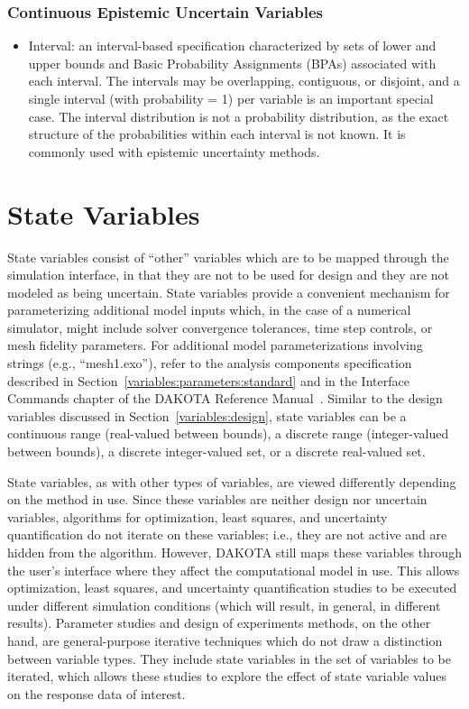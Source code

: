 \subsubsection{Continuous Epistemic Uncertain Variables}\label{variables:uncertain:ceuv}

\begin{itemize}

\item Interval: an interval-based specification characterized by sets of
  lower and upper bounds and Basic Probability Assignments (BPAs)
  associated with each interval.  The intervals may be overlapping,
  contiguous, or disjoint, and a single interval (with probability =
  1) per variable is an important special case.  The interval
  distribution is not a probability distribution, as the exact
  structure of the probabilities within each interval is not known.
  It is commonly used with epistemic uncertainty methods.

\end{itemize}

\section{State Variables}\label{variables:state}

State variables consist of ``other'' variables which are to be mapped
through the simulation interface, in that they are not to be used for
design and they are not modeled as being uncertain. State variables
provide a convenient mechanism for parameterizing additional model
inputs which, in the case of a numerical simulator, might include
solver convergence tolerances, time step controls, or mesh fidelity
parameters. For additional model parameterizations involving strings
(e.g., ``mesh1.exo''), refer to the analysis components specification
described in Section~\ref{variables:parameters:standard} and in the
Interface Commands chapter of the DAKOTA Reference
Manual~\cite{RefMan}.  Similar to the design variables discussed in
Section~\ref{variables:design}, state variables can be a continuous
range (real-valued between bounds), a discrete range (integer-valued
between bounds), a discrete integer-valued set, or a discrete
real-valued set.

State variables, as with other types of variables, are viewed
differently depending on the method in use. Since these variables are
neither design nor uncertain variables, algorithms for optimization,
least squares, and uncertainty quantification do not iterate on these
variables; i.e., they are not active and are hidden from the
algorithm. However, DAKOTA still maps these variables through the
user's interface where they affect the computational model in use.
This allows optimization, least squares, and uncertainty
quantification studies to be executed under different simulation
conditions (which will result, in general, in different results).
Parameter studies and design of experiments methods, on the other
hand, are general-purpose iterative techniques which do not draw a
distinction between variable types. They include state variables in
the set of variables to be iterated, which allows these studies to
explore the effect of state variable values on the response data of
interest.


